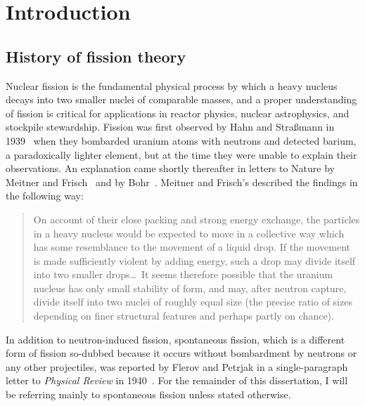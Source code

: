\chapter{Introduction}\label{chap:Intro}

\section{History of fission theory}
Nuclear fission is the fundamental physical process by which a heavy nucleus decays into two smaller nuclei of comparable masses, and a proper understanding of fission is critical for applications in reactor physics, nuclear astrophysics, and stockpile stewardship. Fission was first observed by Hahn and Stra\ss{}mann in 1939~\cite{Hahn1939} when they bombarded uranium atoms with neutrons and detected barium, a paradoxically lighter element, but at the time they were unable to explain their observations. An explanation came shortly thereafter in letters to Nature by Meitner and Frisch~\cite{Meitner1939b} and by Bohr~\cite{Bohr1939a}. Meitner and Frisch's described the findings in the following way:

\begin{quote}
On account of their close packing and strong energy exchange, the particles in a heavy nucleus would be expected to move in a collective way which has some resemblance to the movement of a liquid drop. If the movement is made sufficiently violent by adding energy, such a drop may divide itself into two smaller drops\dots \ It seems therefore possible that the uranium nucleus has only small stability of form, and may, after neutron capture, divide itself into two nuclei of roughly equal size (the precise ratio of sizes depending on finer structural features and perhaps partly on chance).
\end{quote}

\noindent In addition to neutron-induced fission, spontaneous fission, which is a different form of fission so-dubbed because it occurs without bombardment by neutrons or any other projectiles, was reported by Flerov and Petrjak in a single-paragraph letter to \textit{Physical Review} in 1940~\cite{Flerov1940}. For the remainder of this dissertation, I will be referring mainly to spontaneous fission unless stated otherwise.


